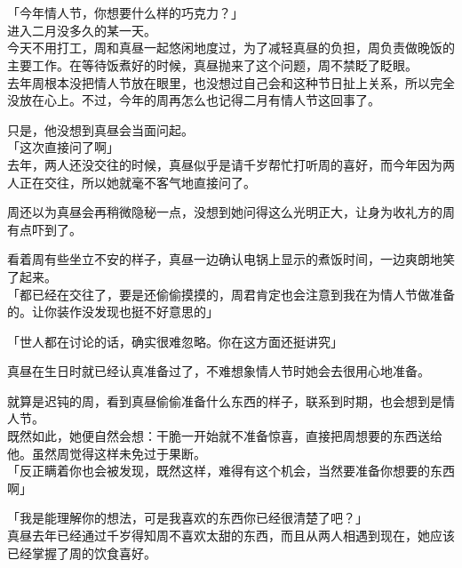 \subsection{　}

「今年情人节，你想要什么样的巧克力？」\\

进入二月没多久的某一天。\\

今天不用打工，周和真昼一起悠闲地度过，为了减轻真昼的负担，周负责做晚饭的主要工作。在等待饭煮好的时候，真昼抛来了这个问题，周不禁眨了眨眼。\\

去年周根本没把情人节放在眼里，也没想过自己会和这种节日扯上关系，所以完全没放在心上。不过，今年的周再怎么也记得二月有情人节这回事了。

只是，他没想到真昼会当面问起。\\

「这次直接问了啊」\\

去年，两人还没交往的时候，真昼似乎是请千岁帮忙打听周的喜好，而今年因为两人正在交往，所以她就毫不客气地直接问了。

周还以为真昼会再稍微隐秘一点，没想到她问得这么光明正大，让身为收礼方的周有点吓到了。

看着周有些坐立不安的样子，真昼一边确认电锅上显示的煮饭时间，一边爽朗地笑了起来。\\

「都已经在交往了，要是还偷偷摸摸的，周君肯定也会注意到我在为情人节做准备的。让你装作没发现也挺不好意思的」

「世人都在讨论的话，确实很难忽略。你在这方面还挺讲究」

真昼在生日时就已经认真准备过了，不难想象情人节时她会去很用心地准备。

就算是迟钝的周，看到真昼偷偷准备什么东西的样子，联系到时期，也会想到是情人节。\\

既然如此，她便自然会想：干脆一开始就不准备惊喜，直接把周想要的东西送给他。虽然周觉得这样未免过于果断。\\

「反正瞒着你也会被发现，既然这样，难得有这个机会，当然要准备你想要的东西啊」

「我是能理解你的想法，可是我喜欢的东西你已经很清楚了吧？」\\

真昼去年已经通过千岁得知周不喜欢太甜的东西，而且从两人相遇到现在，她应该已经掌握了周的饮食喜好。


